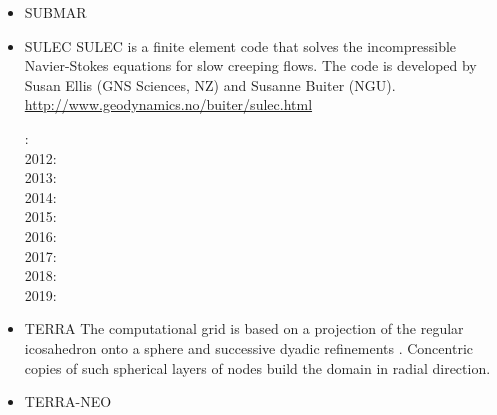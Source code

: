 \begin{itemize}
\item {\codefont SUBMAR} 

{\small
\noindent
\cite{masr06}
\cite{masp07}
\cite{roms10}
}

\item {\codefont SULEC} 
SULEC is a finite element code that solves the incompressible Navier-Stokes equations 
for slow creeping flows. The code is developed by Susan Ellis 
(GNS Sciences, NZ) and Susanne Buiter (NGU). 
\url{http://www.geodynamics.no/buiter/sulec.html}

{\small
{}: \cite{qube11}\cite{ellw11}\\
2012: \cite{buit12}\cite{tebu12}\cite{crsg12}\cite{grel12}\\
2013: \cite{ghbu13}\\
2014: \cite{ghbu14}\cite{qubu14}\\
2015: \cite{nabu15}\\
2016: \cite{zwsn16}\\
2017: \cite{nabp17}\\
2018: \cite{tebu18}\\
2019: \cite{elgb19}
}

\item {\codefont TERRA} 
The computational grid is based on a projection of the regular icosahedron onto a 
sphere and successive dyadic refinements \cite{bafr85}.  Concentric copies of such  
spherical layers of nodes build the domain in radial direction.

{\small
\noindent
\cite{baum83}
\cite{glat88}
\cite{tasg93}
\cite{tasg94}
\cite{buba95}
\cite{burb97}\cite{yang97}
\cite{burl98}
\cite{tabg99}
\cite{phbs09}\cite{wodd09}\cite{gows09}
\cite{yayh10}
\cite{woda11}\cite{iahb11}
\cite{dagd12}
\cite{dadb13}
\cite{vade16}
}

\item {\codefont TERRA-NEO} 


\end{itemize}
